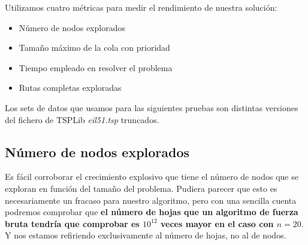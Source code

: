 \documentclass[a4paper, 11pt]{article}
\begin{document}
Utilizamos cuatro métricas para medir el rendimiento de nuestra solución:
\begin{itemize}
  \item Número de nodos explorados
  \item Tamaño máximo de la cola con prioridad
  \item Tiempo empleado en resolver el problema
  \item Rutas completas exploradas
\end{itemize}

Los sets de datos que usamos para las siguientes pruebas son distintas versiones del fichero de TSPLib \textit{eil51.tsp} truncados.
 
\subsection{Número de nodos explorados}
Es fácil corroborar el crecimiento explosivo que tiene el número de nodos que se exploran en función del tamaño del problema. Pudiera parecer que esto es necesariamente un fracaso para nuestro algoritmo, pero con una sencilla cuenta podremos comprobar que \textbf{el número de hojas que un algoritmo de fuerza bruta tendría que comprobar es $10^{12}$ veces mayor en el caso con $n = 20$}. Y nos estamos refiriendo exclusivamente al número de hojas, no al de nodos.
\end{document}
